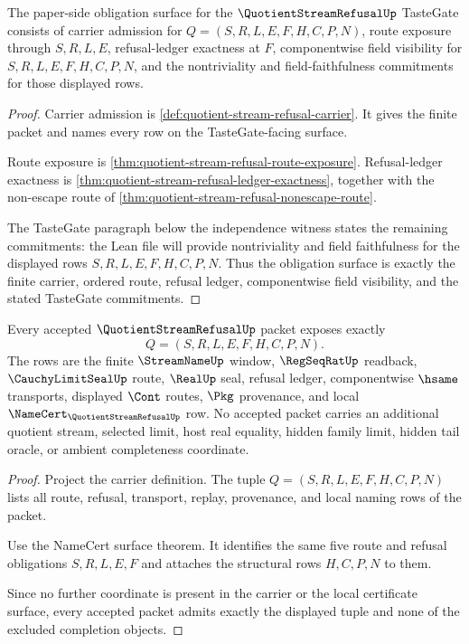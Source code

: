 \begin{theorem}
\label{thm:quotient-stream-refusal-tastegate-obligation-surface}
The paper-side obligation surface for the $\QuotientStreamRefusalUp$ TasteGate consists of carrier admission for $Q=(S,R,L,E,F,H,C,P,N)$, route exposure through $S,R,L,E$, refusal-ledger exactness at $F$, componentwise field visibility for $S,R,L,E,F,H,C,P,N$, and the nontriviality and field-faithfulness commitments for those displayed rows.
\end{theorem}
\begin{proof}
Carrier admission is \autoref{def:quotient-stream-refusal-carrier}. It gives the finite packet and names every row on the TasteGate-facing surface.

Route exposure is \autoref{thm:quotient-stream-refusal-route-exposure}. Refusal-ledger exactness is \autoref{thm:quotient-stream-refusal-ledger-exactness}, together with the non-escape route of \autoref{thm:quotient-stream-refusal-nonescape-route}.

The TasteGate paragraph below the independence witness states the remaining commitments: the Lean file will provide nontriviality and field faithfulness for the displayed rows $S,R,L,E,F,H,C,P,N$. Thus the obligation surface is exactly the finite carrier, ordered route, refusal ledger, componentwise field visibility, and the stated TasteGate commitments.
\end{proof}

\begin{theorem}
\label{thm:quotient-stream-refusal-carrier-admission}
Every accepted $\QuotientStreamRefusalUp$ packet exposes exactly
$$
Q=(S,R,L,E,F,H,C,P,N).
$$
The rows are the finite $\StreamNameUp$ window, $\RegSeqRatUp$ readback, $\CauchyLimitSealUp$ route, $\RealUp$ seal, refusal ledger, componentwise $\hsame$ transports, displayed $\Cont$ routes, $\Pkg$ provenance, and local $\NameCert_{\QuotientStreamRefusalUp}$ row. No accepted packet carries an additional quotient stream, selected limit, host real equality, hidden family limit, hidden tail oracle, or ambient completeness coordinate.
\end{theorem}
\begin{proof}
Project the carrier definition. The tuple $Q=(S,R,L,E,F,H,C,P,N)$ lists all route, refusal, transport, replay, provenance, and local naming rows of the packet.

Use the NameCert surface theorem. It identifies the same five route and refusal obligations $S,R,L,E,F$ and attaches the structural rows $H,C,P,N$ to them.

Since no further coordinate is present in the carrier or the local certificate surface, every accepted packet admits exactly the displayed tuple and none of the excluded completion objects.
\end{proof}

